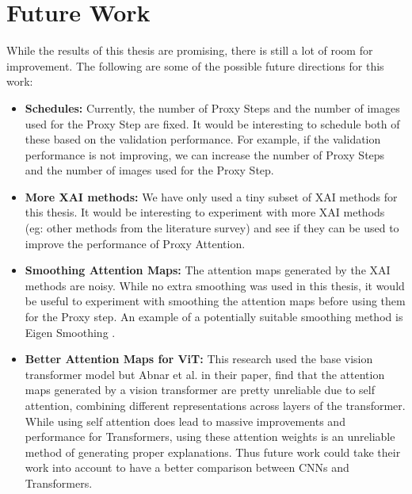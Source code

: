 \section{Future Work}
While the results of this thesis are promising, there is still a lot of room for improvement. The following are some of the possible future directions for this work:
\begin{itemize}
    \item \textbf{Schedules:} Currently, the number of Proxy Steps and the number of images used for the Proxy Step are fixed. It would be interesting to schedule both of these based on the validation performance. For example, if the validation performance is not improving, we can increase the number of Proxy Steps and the number of images used for the Proxy Step.
    \item \textbf{More XAI methods:} We have only used a tiny subset of XAI methods for this thesis. It would be interesting to experiment with more XAI methods (eg: other methods from the literature survey) and see if they can be used to improve the performance of Proxy Attention.
    \item \textbf{Smoothing Attention Maps:} The attention maps generated by the XAI methods are noisy. While no extra smoothing was used in this thesis, it would be useful to experiment with smoothing the attention maps before using them for the Proxy step. An example of a potentially suitable smoothing method is Eigen Smoothing \cite{jacobPyTorchLibraryCAM2021}.
    \item \textbf{Better Attention Maps for ViT:} This research used the base vision transformer model but Abnar et al. \cite{abnarQuantifyingAttentionFlow2020} in their paper, find that the attention maps generated by a vision transformer are pretty unreliable due to self attention, combining different representations across layers of the transformer. While using self attention does lead to massive improvements and performance for Transformers, using these attention weights is an unreliable method of generating proper explanations. Thus future work could take their work into account to have a better comparison between CNNs and Transformers.
\end{itemize}
